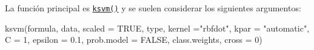 \documentclass[
]{book}
\newenvironment{Shaded}{\begin{snugshade}}{\end{snugshade}}
\newcommand{\AttributeTok}[1]{\textcolor[rgb]{0.77,0.63,0.00}{#1}}
\newcommand{\ConstantTok}[1]{\textcolor[rgb]{0.00,0.00,0.00}{#1}}
\newcommand{\DecValTok}[1]{\textcolor[rgb]{0.00,0.00,0.81}{#1}}
\newcommand{\FloatTok}[1]{\textcolor[rgb]{0.00,0.00,0.81}{#1}}
\newcommand{\FunctionTok}[1]{\textcolor[rgb]{0.00,0.00,0.00}{#1}}
\newcommand{\NormalTok}[1]{#1}
\newcommand{\StringTok}[1]{\textcolor[rgb]{0.31,0.60,0.02}{#1}}
\theoremstyle{break}
\theoremstyle{nonumberplain}
\begin{document}
La función principal es \href{https://rdrr.io/pkg/kernlab/man/ksvm.html}{\texttt{ksvm()}} y se suelen considerar los siguientes argumentos:

\begin{Shaded}
\begin{Highlighting}[]
\FunctionTok{ksvm}\NormalTok{(formula, data, }\AttributeTok{scaled =} \ConstantTok{TRUE}\NormalTok{, type, }\AttributeTok{kernel =}\StringTok{"rbfdot"}\NormalTok{, }\AttributeTok{kpar =} \StringTok{"automatic"}\NormalTok{,}
     \AttributeTok{C =} \DecValTok{1}\NormalTok{, }\AttributeTok{epsilon =} \FloatTok{0.1}\NormalTok{, }\AttributeTok{prob.model =} \ConstantTok{FALSE}\NormalTok{, class.weights, }\AttributeTok{cross =} \DecValTok{0}\NormalTok{)}
\end{Highlighting}
\end{Shaded}
\end{document}
